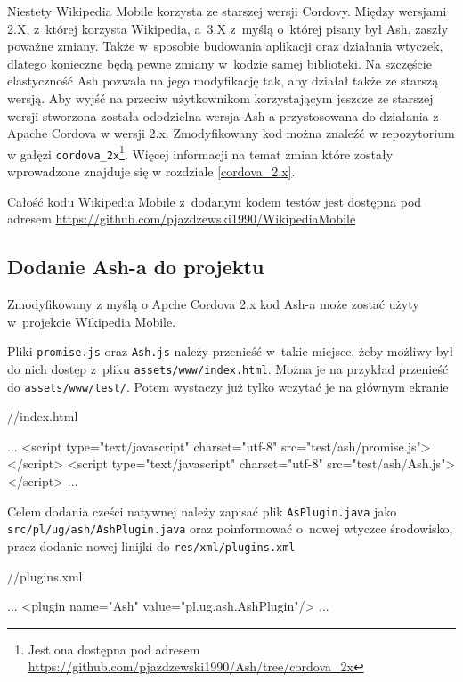 \documentclass{xmgr}
\begin{document}
Niestety Wikipedia Mobile korzysta ze starszej wersji Cordovy. Między wersjami 2.X, z~której korzysta Wikipedia, a~3.X z~myślą o~której pisany był Ash, zaszły poważne zmiany. Także w~sposobie budowania aplikacji oraz działania wtyczek, dlatego konieczne będą pewne zmiany w~kodzie samej biblioteki. Na szczęście elastyczność Ash pozwala na jego modyfikację tak, aby działał także ze starszą wersją. Aby wyjść na przeciw użytkownikom korzystającym jeszcze ze starszej wersji stworzona została ododzielna wersja Ash-a przystosowana do działania z Apache Cordova w wersji 2.x. Zmodyfikowany kod można znaleźć w repozytorium w gałęzi  \texttt{cordova\_2x}\footnote{Jest ona dostępna pod adresem \url{https://github.com/pjazdzewski1990/Ash/tree/cordova\_2x} }. Więcej informacji na temat zmian które zostały wprowadzone znajduje się w rozdziale \ref{cordova_2.x}. 

Całość kodu Wikipedia Mobile z~dodanym kodem testów jest dostępna pod adresem \url{https://github.com/pjazdzewski1990/WikipediaMobile} 

\subsection{Dodanie Ash-a do projektu}

Zmodyfikowany z myślą o Apche Cordova 2.x kod Ash-a może zostać użyty w~projekcie Wikipedia Mobile. 

Pliki \texttt{promise.js} oraz \texttt{Ash.js} należy przenieść w~takie miejsce, żeby możliwy był do nich dostęp z~pliku \texttt{assets/www/index.html}. Można je na przykład przenieść do \texttt{assets/www/test/}. Potem wystaczy już tylko wczytać je na głównym ekranie 

\begin{htmlcode}
   //index.html
  
  ...
  <script type="text/javascript" 
        charset="utf-8" src="test/ash/promise.js"></script>
  <script type="text/javascript" 
        charset="utf-8" src="test/ash/Ash.js"></script>
  ...

\end{htmlcode}

Celem dodania cześci natywnej należy zapisać plik \texttt{AsPlugin.java} jako \texttt{src/pl/ug/ash/AshPlugin.java} oraz poinformować o~nowej wtyczce środowisko, przez dodanie nowej linijki do \texttt{res/xml/plugins.xml}

\begin{htmlcode}
   //plugins.xml
  
  ...
  <plugin name="Ash" value="pl.ug.ash.AshPlugin"/>
  ...

\end{htmlcode}
\end{document}
